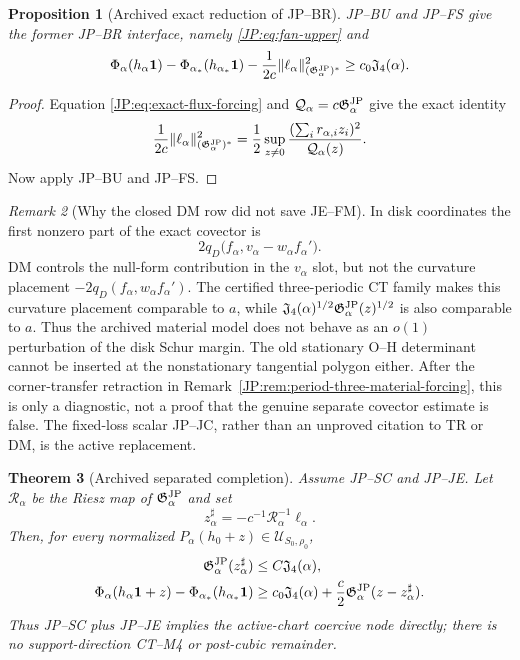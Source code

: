 \documentclass[11pt]{amsart}
\numberwithin{equation}{section}
\newtheorem{theorem}{Theorem}[section]
\newtheorem{proposition}[theorem]{Proposition}
\theoremstyle{definition}
\theoremstyle{remark}
\newtheorem{remark}[theorem]{Remark}
\newcommand{\Jfour}{\mathfrak J_4}
\newcommand{\Gjp}{\mathfrak G^{\rm JP}}
\begin{document}
\begin{proposition}[Archived exact reduction of JP--BR]
\label{JP:prop:BR-reduction}
JP--BU and JP--FS give the former JP--BR interface, namely
\eqref{JP:eq:fan-upper} and
\begin{equation}\label{JP:eq:BR}
 \Phi_\alpha(h_\alpha\mathbf1)
 -\Phi_{\alpha_*}(h_{\alpha_*}\mathbf1)
 -\frac1{2c}\|\ell_\alpha\|_{(\Gjp_\alpha)^*}^2
 \ge c_0\Jfour(\alpha).
\end{equation}
\end{proposition}

\begin{proof}
Equation \eqref{JP:eq:exact-flux-forcing} and
$\mathcal Q_\alpha=c\Gjp_\alpha$ give the exact identity
\[
 \frac1{2c}\|\ell_\alpha\|_{(\Gjp_\alpha)^*}^2
 =\frac12\sup_{z\ne0}
 \frac{(\sum_i r_{\alpha,i}z_i)^2}{\mathcal Q_\alpha(z)}.
\]
Now apply JP--BU and JP--FS.
\end{proof}

\begin{remark}[Why the closed DM row did not save JE--FM]
In disk coordinates the first nonzero part of the exact covector is
\[
 2q_D\bigl(f_\alpha,
       v_\alpha-w_\alpha f_\alpha'\bigr).
\]
DM controls the null-form contribution in the $v_\alpha$ slot, but not the
curvature placement $-2q_D(f_\alpha,w_\alpha f_\alpha')$.  The certified
three-periodic CT family makes this curvature placement comparable to
$a$, while
$\Jfour(\alpha)^{1/2}\Gjp_\alpha(z)^{1/2}$ is also comparable to $a$.
Thus the archived material model does not behave as an $o(1)$ perturbation
of the disk Schur margin.  The old stationary O--H determinant cannot be
inserted at the nonstationary tangential polygon either.  After the
corner-transfer retraction in
Remark~\ref{JP:rem:period-three-material-forcing}, this is only a diagnostic,
not a proof that the genuine separate covector estimate is false.  The
fixed-loss scalar JP--JC, rather than an unproved citation to TR or DM, is
the active replacement.
\end{remark}

\begin{theorem}[Archived separated completion]
\label{JP:thm:completion}
Assume JP--SC and JP--JE.  Let $\mathcal R_\alpha$ be the Riesz map of
$\Gjp_\alpha$ and set
\begin{equation}\label{JP:eq:corrector}
 z_\alpha^\sharp=-c^{-1}\mathcal R_\alpha^{-1}\ell_\alpha.
\end{equation}
Then, for every normalized
$P_\alpha(h_0+z)\in\mathcal U_{S_0,\rho_0}$,
\begin{align}
 \Gjp_\alpha(z_\alpha^\sharp)&\le C\Jfour(\alpha),
 \label{JP:eq:corrector-bound}\\
 \Phi_\alpha(h_\alpha\mathbf1+z)
 -\Phi_{\alpha_*}(h_{\alpha_*}\mathbf1)
 &\ge c_0\Jfour(\alpha)
 +\frac c2\Gjp_\alpha(z-z_\alpha^\sharp).
 \label{JP:eq:joint-gap}
\end{align}
Thus JP--SC plus JP--JE implies the active-chart coercive node directly;
there is no support-direction CT--M4 or post-cubic remainder.
\end{theorem}
\end{document}
